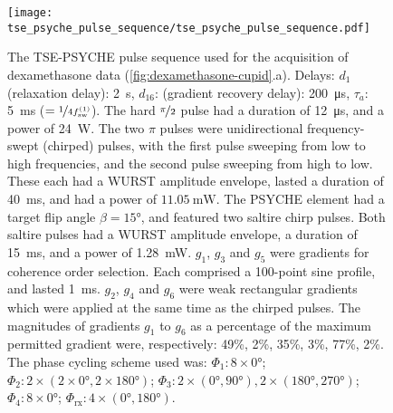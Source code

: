 \begin{figure}[H]
    \centering
    \texttt{[image: tse\_psyche\_pulse\_sequence/tse\_psyche\_pulse\_sequence.pdf]}
    \caption[
        The \acs{TSE-PSYCHE} pulse sequence which was used for the acquisition of
        the dexamethasone data presented in \cref{fig:dexamethasone-cupid}.
    ]{
        The \acs{TSE-PSYCHE} pulse sequence used for the acquisition of
        dexamethasone
        data (\cref{fig:dexamethasone-cupid}.a).
        Delays:
        $d_1$ (relaxation delay): \qty{2}{\second},
        $d_{16}$: (gradient recovery delay): \qty{200}{\micro\second},
        $\tau_a$: \qty{5}{\milli\second} ($= \nicefrac{1}{4
        f_{\text{sw}}^{(1)}}$).
        The hard $\nicefrac{\pi}{2}$ pulse had a duration of
        \qty{12}{\micro\second}, and a power of \qty{24}{\watt}.
        The two $\pi$ pulses were unidirectional frequency-swept (chirped) pulses,
        with the first pulse sweeping from low to high frequencies, and the second
        pulse sweeping from high to low. These each had a \acs{WURST} amplitude
        envelope, lasted a duration of \qty{40}{\milli\second}, and had a power
        of $\qty{11.05}{\milli\watt}$.
        The \ac{PSYCHE} element had a target flip angle $\beta = \ang{15}$, and
        featured two saltire chirp pulses. Both saltire pulses had a
        \ac{WURST} amplitude envelope, a duration of \qty{15}{\milli\second},
        and a power of
        \qty{1.28}{\milli\watt}.
        $g_1$, $g_3$ and $g_5$ were gradients for coherence order selection.
        Each comprised a 100-point sine profile, and lasted
        \qty{1}{\milli\second}. $g_2$, $g_4$ and $g_6$ were weak rectangular gradients
        which were applied at the same time as the chirped pulses.
        The magnitudes of gradients $g_1$ to  $g_6$ as a percentage of the
        maximum permitted gradient were, respectively:
        49\%, 2\%, 35\%, 3\%, 77\%, 2\%.
        The phase cycling scheme used was:
        $\Phi_1: 8 \times \ang{0}$;
        $\Phi_2: 2 \times (2 \times \ang{0}, 2 \times \ang{180})$;
        $\Phi_3: 2 \times (\ang{0}, \ang{90}), 2 \times (\ang{180}, \ang{270})$;
        $\Phi_4: 8 \times \ang{0}$;
        $\Phi_{\text{rx}}: 4 \times (\ang{0}, \ang{180})$.
    }
    \label{fig:tse_psyche}


\end{figure}
